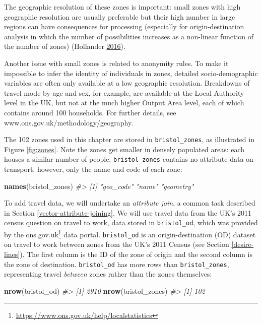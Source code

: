 \documentclass[]{krantz}
\makeatletter
\newenvironment{Shaded}{\begin{snugshade}}{\end{snugshade}}
\newcommand{\CommentTok}[1]{\textcolor[rgb]{0.37,0.37,0.37}{\textit{#1}}}
\newcommand{\KeywordTok}[1]{\textcolor[rgb]{0.27,0.27,0.27}{\textbf{#1}}}
\newcommand{\NormalTok}[1]{#1}
\let\rmarkdownfootnote\footnote%
\def\footnote{\protect\rmarkdownfootnote}
\renewcommand{\href}[2]{#2\footnote{\url{#1}}}
\newenvironment{kframe}{%
\medskip{}
\setlength{\fboxsep}{.8em}
 \def\at@end@of@kframe{}%
 \ifinner\ifhmode%
  \def\at@end@of@kframe{\end{minipage}}%
  \begin{minipage}{\columnwidth}%
 \fi\fi%
 \def\FrameCommand##1{\hskip\@totalleftmargin \hskip-\fboxsep
 \colorbox{shadecolor}{##1}\hskip-\fboxsep
     \hskip-\linewidth \hskip-\@totalleftmargin \hskip\columnwidth}%
 \MakeFramed {\advance\hsize-\width
   \@totalleftmargin\z@ \linewidth\hsize
   \@setminipage}}%
 {\par\unskip\endMakeFramed%
 \at@end@of@kframe}
\newenvironment{rmdblock}[1]
  {
  \begin{itemize}
  \renewcommand{\labelitemi}{
    \raisebox{-.7\height}[0pt][0pt]{
      {\setkeys{Gin}{width=3em,keepaspectratio}\texttt{[image: images/\#1]}}
    }
  }
  \setlength{\fboxsep}{1em}
  \begin{kframe}
  \item
  }
  {
  \end{kframe}
  \end{itemize}
  }
\newenvironment{rmdnote}
  {\begin{rmdblock}{note}}
  {\end{rmdblock}}
\makeatother
\begin{document}
The geographic resolution of these zones is important: small zones with high geographic resolution are usually preferable but their high number in large regions can have consequences for processing (especially for origin-destination analysis in which the number of possibilities increases as a non-linear function of the number of zones) (Hollander \protect\hyperlink{ref-hollander_transport_2016}{2016}).

\begin{rmdnote}
Another issue with small zones is related to anonymity rules. To make it
impossible to infer the identity of individuals in zones, detailed
socio-demographic variables are often only available at a low geographic
resolution. Breakdowns of travel mode by age and sex, for example, are
available at the Local Authority level in the UK, but not at the much
higher Output Area level, each of which contains around 100 households.
For further details, see www.ons.gov.uk/methodology/geography.
\end{rmdnote}

The 102 zones used in this chapter are stored in \texttt{bristol\_zones}, as illustrated in Figure \ref{fig:zones}.
Note the zones get smaller in densely populated areas: each houses a similar number of people.
\texttt{bristol\_zones} contains no attribute data on transport, however, only the name and code of each zone:

\begin{Shaded}
\begin{Highlighting}[]
\KeywordTok{names}\NormalTok{(bristol_zones)}
\CommentTok{#> [1] "geo_code" "name"     "geometry"}
\end{Highlighting}
\end{Shaded}

To add travel data, we will undertake an \emph{attribute join}, a common task described in Section \ref{vector-attribute-joining}.
We will use travel data from the UK's 2011 census question on travel to work, data stored in \texttt{bristol\_od}, which was provided by the \href{https://www.ons.gov.uk/help/localstatistics}{ons.gov.uk} data portal.
\texttt{bristol\_od} is an origin-destination (OD) dataset on travel to work between zones from the UK's 2011 Census (see Section \ref{desire-lines}).
The first column is the ID of the zone of origin and the second column is the zone of destination.
\texttt{bristol\_od} has more rows than \texttt{bristol\_zones}, representing travel \emph{between} zones rather than the zones themselves:

\begin{Shaded}
\begin{Highlighting}[]
\KeywordTok{nrow}\NormalTok{(bristol_od)}
\CommentTok{#> [1] 2910}
\KeywordTok{nrow}\NormalTok{(bristol_zones)}
\CommentTok{#> [1] 102}
\end{Highlighting}
\end{Shaded}
\end{document}
